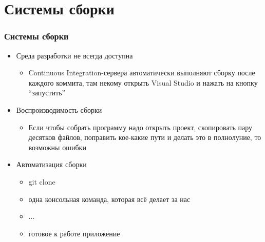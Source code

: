 \documentclass{../../slides-style}
\begin{document}
    \section{Системы сборки}

    \begin{frame}
        \frametitle{Системы сборки}
        \begin{itemize}
            \item Среда разработки не всегда доступна
            \begin{itemize}
                \item Continuous Integration-сервера автоматически выполняют сборку после каждого коммита, там некому открыть Visual Studio и нажать на кнопку ``запустить''
            \end{itemize}
            \item Воспроизводимость сборки
            \begin{itemize}
                \item Если чтобы собрать программу надо открыть проект, скопировать пару десятков файлов, поправить кое-какие пути и делать это в полнолуние, то возможны ошибки
            \end{itemize}
            \item Автоматизация сборки
            \begin{itemize}
                \item git clone
                \item одна консольная команда, которая всё делает за нас
                \item ...
                \item готовое к работе приложение
            \end{itemize}
        \end{itemize}
    \end{frame}
\end{document}
